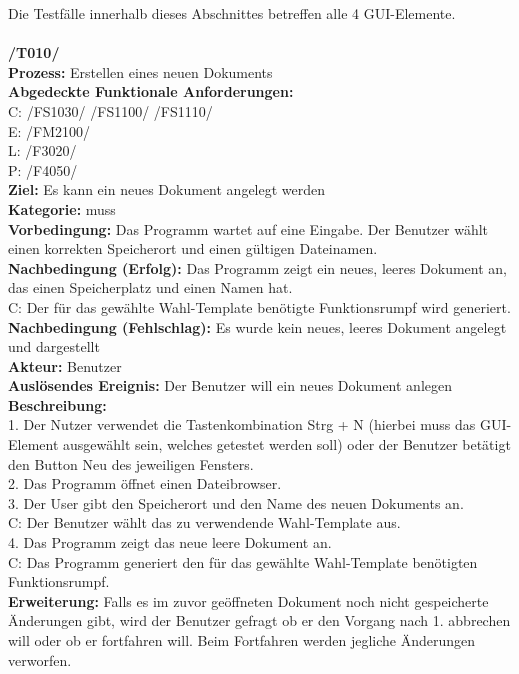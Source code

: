 \documentclass[a4paper]{scrreprt}
\begin{document}
Die Testfälle innerhalb dieses Abschnittes betreffen alle 4 GUI-Elemente. \\\\
\textbf{/T010/}\\
\textbf{Prozess: }Erstellen eines neuen Dokuments  \\
\textbf{Abgedeckte Funktionale Anforderungen:} \\
C: /FS1030/ /FS1100/ /FS1110/ \\
E: /FM2100/	\\
L: /F3020/ \\
P: /F4050/	\\
\textbf{Ziel:} Es kann ein neues Dokument angelegt werden\\
\textbf{Kategorie:} muss\\
\textbf{Vorbedingung:} Das Programm wartet auf eine Eingabe. Der Benutzer wählt einen korrekten Speicherort und einen gültigen Dateinamen.\\
\textbf{Nachbedingung (Erfolg):} Das Programm zeigt ein neues, leeres Dokument an, das einen Speicherplatz und einen Namen hat.\\
C: Der für das gewählte Wahl-Template benötigte Funktionsrumpf wird generiert.
\textbf{Nachbedingung (Fehlschlag):} Es wurde kein neues, leeres Dokument angelegt und dargestellt\\
\textbf{Akteur:} Benutzer\\
\textbf{Auslösendes Ereignis:} Der Benutzer will ein neues Dokument anlegen\\
\textbf{Beschreibung:} \\
1. Der Nutzer verwendet die Tastenkombination Strg + N (hierbei muss das GUI-Element ausgewählt sein, welches getestet werden soll) oder der Benutzer betätigt den Button Neu des jeweiligen Fensters. \\
2. Das Programm öffnet einen Dateibrowser.\\
3. Der User gibt den Speicherort und den Name des neuen Dokuments an. \\
C: Der Benutzer wählt das zu verwendende Wahl-Template aus.\\
4. Das Programm zeigt das neue leere Dokument an. \\
C: Das Programm generiert den für das gewählte Wahl-Template benötigten Funktionsrumpf. \\
\textbf {Erweiterung:} Falls es im zuvor geöffneten Dokument noch nicht gespeicherte Änderungen gibt, wird der Benutzer gefragt ob er den Vorgang nach 1. abbrechen will oder ob er fortfahren will. Beim Fortfahren werden jegliche Änderungen verworfen. \\
\end{document}
